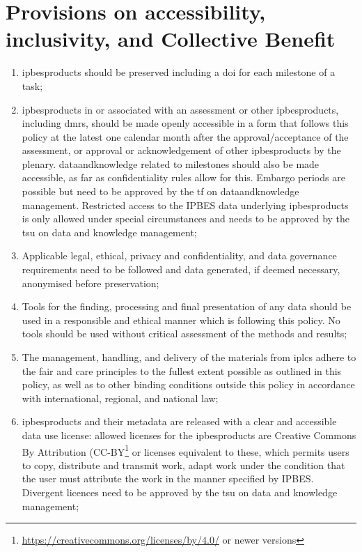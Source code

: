\documentclass{article}
\begin{document}
\section{Provisions on accessibility, inclusivity, and Collective Benefit}

\begin{enumerate}[label=(\alph*)]
    \item \glspl{ipbesproduct} should be preserved including a \gls{doi} for each \gls{milestone} of a \gls{task};

    \item \glspl{ipbesproduct} in or associated with an assessment or other \glspl{ipbesproduct}, including \glspl{dmr}, should be made openly \gls{accessible} in a form that follows this policy at the latest one calendar month after the approval/acceptance of the assessment, or approval or acknowledgement of other \glspl{ipbesproduct} by the \gls{plenary}. \gls{dataandknowledge} related to \glspl{milestone} should also be made \gls{accessible}, as far as confidentiality rules allow for this. Embargo periods are possible but need to be approved by the \gls{tf} on \gls{dataandknowledge} management. Restricted access to the IPBES \gls{data} underlying \glspl{ipbesproduct} is only allowed under special circumstances and needs to be approved by the  \gls{tsu} on \gls{data} and \gls{knowledge} management;

    \item Applicable legal, ethical, privacy and confidentiality, and \gls{data} governance requirements need to be followed and \gls{data} generated, if deemed necessary, anonymised before preservation;

    \item Tools for the finding, processing and final presentation of any \gls{data} should be used in a responsible and ethical manner which is following this policy. No tools should be used without critical assessment of the methods and results;

    \item The management, handling, and delivery of the materials from \glspl{iplc} adhere to the \gls{fair} and \gls{care} principles to the fullest extent possible as outlined in this policy, as well as to other binding conditions outside this policy in accordance with international, regional, and national law;

    \item \glspl{ipbesproduct} and their metadata are released with a clear and \gls{accessible} \gls{data} use license: allowed licenses for the \glspl{ipbesproduct} are Creative Commons By Attribution (CC-BY\footnote{\href{https://creativecommons.org/licenses/by/4.0/}{https://creativecommons.org/licenses/by/4.0/} or newer versions} or licenses equivalent to these, which permits users to copy, distribute and transmit work, adapt work under the condition that the user must attribute the work in the manner specified by IPBES. Divergent licences need to be approved by the  \gls{tsu} on \gls{data} and \gls{knowledge} management;


\end{enumerate}
\end{document}
